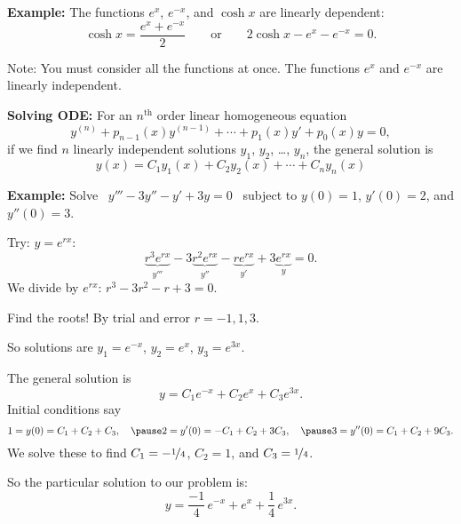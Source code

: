 \documentclass[10pt,aspectratio=169]{beamer}
\begin{document}
\begin{frame}
\textbf{Example:}
The functions $e^x$, $e^{-x}$, and $\cosh x$ are linearly
dependent:
\pause
\[
\cosh x = \frac{e^x + e^{-x}}{2} 
\qquad
\text{or}
\qquad
2 \cosh x - e^x - e^{-x} = 0.
\]

\medskip
\pause

Note: You must consider all the functions at once.
The functions
$e^x$ and $e^{-x}$ are linearly independent.

\medskip
\pause

\textbf{Solving ODE:}
For an $n^{\text{th}}$ order linear homogeneous equation
\[
y^{(n)} + p_{n-1}(x)y^{(n-1)} + \cdots + p_1(x) y' + p_0(x) y = 0 ,
\]
if we find $n$ linearly independent solutions
$y_1$, $y_2$, \ldots, $y_n$, the general solution is
\[
y(x) = C_1 y_1(x) + C_2 y_2(x) + \cdots + C_n y_n(x) 
\]

\end{frame}

\begin{frame}
\textbf{Example:}
Solve
~$y''' - 3 y'' - y' + 3y = 0$~
subject to
$y(0) = 1$, $y'(0) = 2$, and $y''(0) = 3$.

\medskip
\pause

Try: $y = e^{rx}$:
\[
\underbrace{r^3 e^{rx}}_{y'''} - 3 \underbrace{r^2 e^{rx}}_{y''} -
\underbrace{r e^{rx}}_{y'} + 3 \underbrace{e^{rx}}_{y} = 0 .
\]
\pause
We divide by $e^{rx}$: \qquad
$r^3 - 3 r^2 - r + 3 = 0$.

\medskip
\pause

Find the roots! \pause By trial and error $r=-1,1,3$.

\medskip
\pause

So solutions are \quad $y_1 = e^{-x}$, \quad $y_2 = e^{x}$, \quad $y_3 =
e^{3x}$.

\medskip
\pause

The general solution is
\[
y = C_1 e^{-x} + C_2 e^{x} + C_3 e^{3x} .
\]
\pause
Initial conditions say
\[
1 = y(0)  = C_1 + C_2 + C_3 , \quad
\pause
2 = y'(0)  = -C_1 + C_2 + 3C_3 , \quad
\pause
3 = y''(0)  = C_1 + C_2 + 9C_3 .
\]
\pause
We solve these to find
$C_1 = -\nicefrac{1}{4}$, $C_2 = 1$, and $C_3 = \nicefrac{1}{4}$.

\medskip
\pause

So the particular solution to our problem is:
\[
y = \frac{-1}{4}\, e^{-x} + e^x + \frac{1}{4}\, e^{3x} .
\]
\end{frame}
\end{document}
